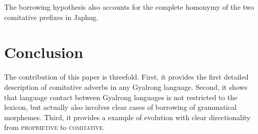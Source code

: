 \documentclass[oldfontcommands,oneside,a4paper,11pt]{article}
\begin{document}
The borrowing hypothesis also accounts for the complete homonymy of the two comitative prefixes in Japhug.

\section*{Conclusion} 
The contribution of this paper is threefold. First, it provides the first detailed description of comitative adverbs in any Gyalrong language. Second, it shows that language contact between Gyalrong languages is not restricted to the lexicon, but actually also involves clear cases of borrowing of grammatical morphemes. Third, it provides a example of evolution with clear directionality from \textsc{proprietive} to \textsc{comitative}.



\end{document}
